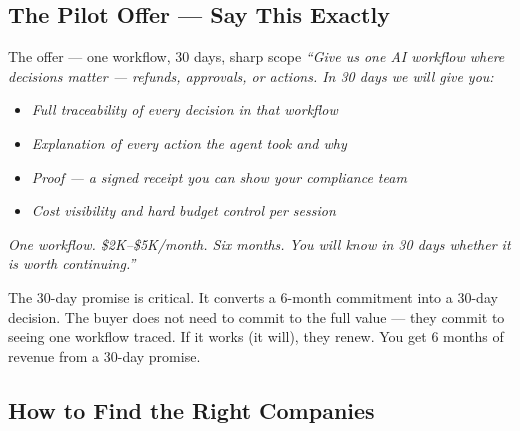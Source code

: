 \subsection{The Pilot Offer --- Say This Exactly}

\begin{conceptbox}{The offer --- one workflow, 30 days, sharp scope}
\centering
\textit{``Give us one AI workflow where decisions matter --- refunds,
approvals, or actions. In 30 days we will give you:}

\smallskip
\begin{itemize}[noitemsep, leftmargin=2em]
  \item \textit{Full traceability of every decision in that workflow}
  \item \textit{Explanation of every action the agent took and why}
  \item \textit{Proof --- a signed receipt you can show your compliance team}
  \item \textit{Cost visibility and hard budget control per session}
\end{itemize}

\smallskip
\textit{One workflow. \$2K--\$5K/month. Six months.
You will know in 30 days whether it is worth continuing.''}
\end{conceptbox}

The 30-day promise is critical. It converts a 6-month commitment into a
30-day decision. The buyer does not need to commit to the full value ---
they commit to seeing one workflow traced. If it works (it will), they
renew. You get 6 months of revenue from a 30-day promise.

\subsection{How to Find the Right Companies}

